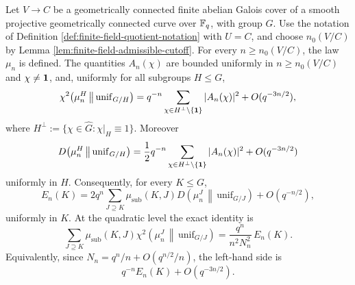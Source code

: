 \begin{theorem}\label{thm:projective-finite-field-chebotarev-entropy-tomography}
Let \(V\to C\) be a geometrically connected finite \etale{} abelian Galois cover of a smooth projective geometrically connected curve over \(\mathbb{F}_q\), with group \(G\). Use the notation of Definition \ref{def:finite-field-quotient-notation} with \(U=C\), and choose \(n_0(V/C)\) by Lemma \ref{lem:finite-field-admissible-cutoff}. For every \(n\ge n_0(V/C)\), the law \(\mu_n\) is defined. The quantities \(A_n(\chi)\) are bounded uniformly in \(n\ge n_0(V/C)\) and \(\chi\ne\mathbf{1}\), and, uniformly for all subgroups \(H\le G\),
\[
\chi^2\!\left(\mu_n^H\,\middle\|\,\mathrm{unif}_{G/H}\right)
=
q^{-n}\sum_{\chi\in H^\perp\setminus\{\mathbf{1}\}}|A_n(\chi)|^2
+O(q^{-3n/2}),
\]
where \(H^\perp:=\{\chi\in\widehat G:\chi|_H\equiv1\}\). Moreover
\[
D\!\left(\mu_n^H\,\middle\|\,\mathrm{unif}_{G/H}\right)
=
\frac12 q^{-n}\sum_{\chi\in H^\perp\setminus\{\mathbf{1}\}}|A_n(\chi)|^2
+O(q^{-3n/2})
\]
uniformly in \(H\). Consequently, for every \(K\le G\),
\[
E_n(K)
=
2q^n\sum_{J\supseteq K}\mu_{\mathrm{sub}}(K,J)
D\!\left(\mu_n^J\,\middle\|\,\mathrm{unif}_{G/J}\right)
+O(q^{-n/2}),
\]
uniformly in \(K\). At the quadratic level the exact identity is
\[
\sum_{J\supseteq K}\mu_{\mathrm{sub}}(K,J)
\chi^2\!\left(\mu_n^J\,\middle\|\,\mathrm{unif}_{G/J}\right)
=
\frac{q^n}{n^2N_n^2}\,E_n(K).
\]
Equivalently, since \(N_n=q^n/n+O(q^{n/2}/n)\), the left-hand side is
\[
q^{-n}E_n(K)+O(q^{-3n/2}).
\]
\end{theorem}

